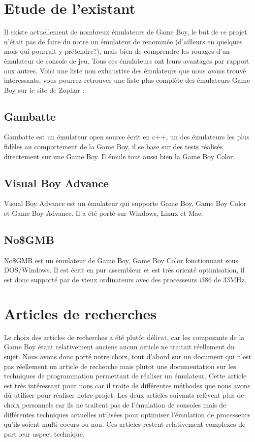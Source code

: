 \documentclass{report}
\begin{document}
\section{Etude de l'existant}
Il existe actuellement de nombreux émulateurs de Game Boy, le but de ce projet n'était pas de faire du notre un émulateur de renommée (d'ailleurs en quelques mois qui pourrait y prétendre?), mais bien de comprendre les rouages d'un émulateur de console de jeu.
Tous ces émulateurs ont leurs avantages par rapport aux autres. Voici une liste non exhaustive des émulateurs que nous avons trouvé intéressants, vous pourrez retrouver une liste plus complète des émulateurs Game Boy sur le site de Zophar \cite{zophar}:

\subsection{Gambatte}
Gambatte \cite{gambatte} est un émulateur open source écrit en c++, un des émulateurs les plus fidèles au comportement de la Game Boy, il se base sur des tests réalisés directement sur une Game Boy. Il émule tout aussi bien la Game Boy Color.
\subsection{Visual Boy Advance}
Visual Boy Advance \cite{visualboyadv} est un émulateur qui supporte Game Boy, Game Boy Color et Game Boy Advance. Il a été porté sur Windows, Linux et Mac.
\subsection{No\$GMB}
No\$GMB \cite{nogmb} est un émulateur de Game Boy, Game Boy Color fonctionnant sous DOS/Windows. Il est écrit en pur assembleur et est très orienté optimisation, il est donc supporté par de vieux ordinateurs avec des processeurs i386 de 33MHz.
\section{Articles de recherches}
Le choix des articles de recherches a été plutôt délicat, car les composants de la Game Boy étant relativement anciens aucun article ne traitait réellement du sujet. Nous avons donc porté notre choix, tout d'abord sur un document qui n'est pas réellement un article de recherche mais plutot une documentation sur les techniques de programmation permettant de réaliser un émulateur. Cette article est très intéressant pour nous car il traite de différentes méthodes que nous avons dû utiliser pour réaliser notre projet. Les deux articles suivants relèvent plus de choix personnels car ils ne traitent pas de l'émulation de consoles mais de différentes techniques actuelles utilisées pour optimiser l'émulation de processeurs qu'ils soient multi-coeurs ou non. Ces articles restent relativement complexes de part leur aspect technique.
\end{document}
